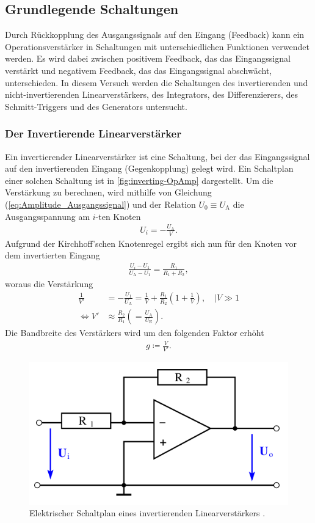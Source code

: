 \subsection{Grundlegende Schaltungen}\label{subsec:Grundlegende Schaltungen}        %
Durch Rückkopplung des Ausgangssignals auf den Eingang (Feedback) kann ein Operationsverstärker in Schaltungen mit unterschiedlichen Funktionen verwendet werden. 
Es wird dabei zwischen positivem Feedback, das das Eingangssignal verstärkt und negativem Feedback, das das Eingangssignal abschwächt, unterschieden.
In diesem Versuch werden die Schaltungen des invertierenden und nicht-invertierenden Linearverstärkers, des Integrators, des Differenzierers, des Schmitt-Triggers und des Generators untersucht.

\subsubsection{Der Invertierende Linearverstärker}\label{subsubsec:Invertierender Linearverstärker}
Ein invertierender Linearverstärker ist eine Schaltung, bei der das Eingangssignal auf den invertierenden Eingang (Gegenkopplung) gelegt wird.
Ein Schaltplan einer solchen Schaltung ist in \autoref{fig:inverting-OpAmp} dargestellt.
Um die Verstärkung zu berechnen, wird mithilfe von Gleichung (\ref{eq:Amplitude_Ausgangssignal}) und der Relation $U_0\equiv U_\text{A}$ die Ausgangsspannung am $i$-ten Knoten
\begin{align}
    U_i=-\frac{U_\text{A}}{V}.
\end{align}
Aufgrund der Kirchhoff'schen Knotenregel ergibt sich nun für den Knoten vor dem invertierten Eingang
\begin{align}
    \frac{U_i-U_1}{U_\text{A}-U_1} = \frac{R_1}{R_1+R_2},
\end{align}
woraus die Verstärkung
\begin{align}
    \label{eq:Verstärkung}
    \frac1{V'}&=-\frac{U_1}{U_\text{A}}=\frac{1}{V}+\frac{R_1}{R_2}\left(1+\frac{1}{V}\right),\quad |V\gg 1 \\
    \iff V' &\approx\frac{R_2}{R_1}\left(=\frac{U_\text{A}}{U_\text{E}}\right).
\end{align}
Die Bandbreite des Verstärkers wird um den folgenden Faktor erhöht
\begin{align}
    g\coloneqq\frac{V}{V'}.
\end{align}
\begin{figure}[H]
	\centering
    \includegraphics[width=0.6\linewidth]{figures/inverting-OpAmp.png}
	\caption{Elektrischer Schaltplan eines invertierenden Linearverstärkers \cite{Anleitung51}.}
	\label{fig:inverting-OpAmp}
\end{figure}

